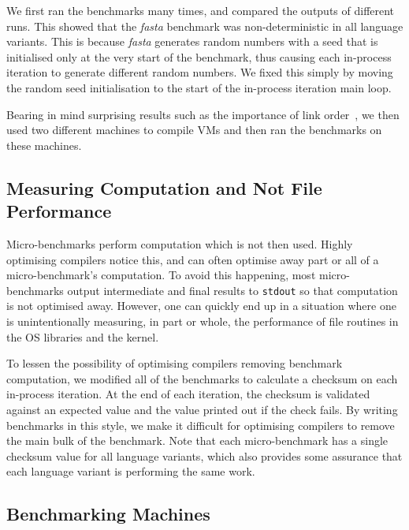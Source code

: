 \documentclass[a4paper,UKenglish]{lipics}
\newcommand{\fasta}{\emph{fasta}\xspace}
\begin{document}
We first ran the benchmarks many  times, and compared the outputs
of different runs. This showed that the \fasta benchmark was non-deterministic
in all language variants. This is because \fasta generates random numbers with
a seed that is initialised only at the very start of the benchmark, thus
causing each in-process iteration to generate different random numbers. We
fixed this simply by moving the random seed initialisation to the start
of the in-process iteration main loop.

Bearing in mind surprising
results such as the importance of link order~\cite{mytkowicz09surprising}, we
then used two different machines to compile VMs and then ran the benchmarks
on these machines. 


\subsection{Measuring Computation and Not File Performance}

Micro-benchmarks perform computation which is not then used. Highly optimising
compilers notice this, and can often optimise away part or all of a
micro-benchmark's computation. To avoid this happening, most micro-benchmarks
output intermediate and final results to \texttt{stdout} so that computation is
not optimised away. However, one can quickly end up in a situation where one is
unintentionally measuring, in part or whole, the performance of file routines in
the OS libraries and the kernel.

To lessen the possibility of optimising compilers removing benchmark computation,
we modified all of the benchmarks to calculate a checksum on each in-process iteration.
At the end of each iteration, the checksum is validated against an expected
value and the value printed out if the check fails. By writing benchmarks in
this style, we make it difficult for optimising compilers to remove the
main bulk of the benchmark. Note that each micro-benchmark has a single checksum value for all
language variants, which also provides some assurance that each language variant is
performing the same work.


\subsection{Benchmarking Machines}
\end{document}
